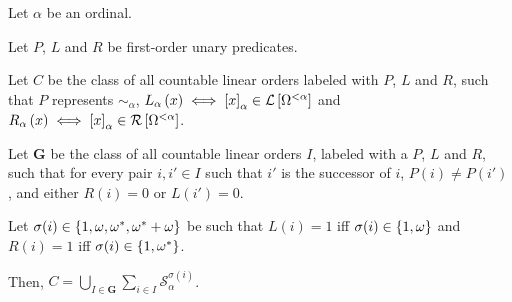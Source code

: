 \begin{lemma}{\label{single-ordinal-decomposition}}
  Let $\alpha$ be an ordinal.

  Let $P$, $L$ and $R$ be
  first-order unary predicates.

  Let $C$ be the class of
  all countable linear orders labeled with $P$, $L$ and $R$,
  such that $P$ represents $\sim_{\alpha}$,
  $L_{\alpha} \left( {x} \right) \iff \left[ {x} \right]_{\alpha} \in \mathcal{L} \left[ {{\Omega^{< \alpha}}} \right]$ and
  $R_{\alpha} \left( {x} \right) \iff \left[ {x} \right]_{\alpha} \in \mathcal{R} \left[ {{\Omega^{< \alpha}}} \right]$.

  Let $\mathbf{G}$ be the class of all countable linear orders $I$,
  labeled with a $P$, $L$ and $R$,
  such that for every pair $i, i' \in I$ such that $i'$ is the successor of $i$,
  $P(i) \ne P(i')$,
  and either $R(i) = 0$ or $L(i') = 0$.

  Let $\sigma(i) \in \left\{ {1, \omega, \omega^\ast, \omega^\ast + \omega} \right\}$ be such that
  $L(i) = 1$ iff $\sigma(i) \in \left\{ {1, \omega} \right\}$ and
  $R(i) = 1$ iff $\sigma(i) \in \left\{ {1, \omega^\ast} \right\}$.

  Then, $C = \bigcup_{I \in \mathbf{G}} \sum_{i \in I} \mathcal{S}^{\sigma(i)}_{\alpha}$.
\end{lemma}

